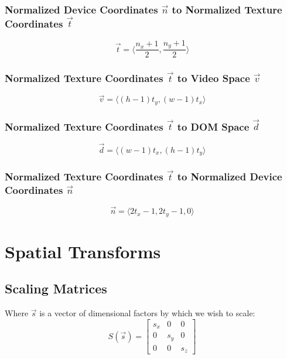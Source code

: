 \subsubsection{Normalized Device Coordinates $\vec{n}$ to Normalized Texture Coordinates $\vec{t}$}
\begin{equation}
    \vec{t} = \langle \frac{n_x + 1}{2}, \frac{n_y + 1}{2} \rangle
\end{equation}

\subsubsection{Normalized Texture Coordinates $\vec{t}$ to Video Space $\vec{v}$}
\begin{equation}
    \vec{v} = \langle (h-1)t_y, (w-1)t_x \rangle
\end{equation}

\subsubsection{Normalized Texture Coordinates $\vec{t}$ to DOM Space $\vec{d}$}
\begin{equation}
    \vec{d} = \langle (w-1)t_x, (h-1)t_y \rangle
\end{equation}

\subsubsection{Normalized Texture Coordinates $\vec{t}$ to Normalized Device Coordinates $\vec{n}$}
\begin{equation}
    \vec{n} = \langle 2t_x - 1, 2t_y - 1, 0 \rangle
\end{equation}


\section{Spatial Transforms}

\subsection{Scaling Matrices}
Where $\vec{s}$ is a vector of dimensional factors by which we wish to scale:
\begin{equation}
S(\vec{s}) =
\begin{bmatrix}
    s_{x} & 0 & 0 \\
    0 & s_{y} & 0 \\
    0 & 0 & s_{z}
\end{bmatrix}
\end{equation}

